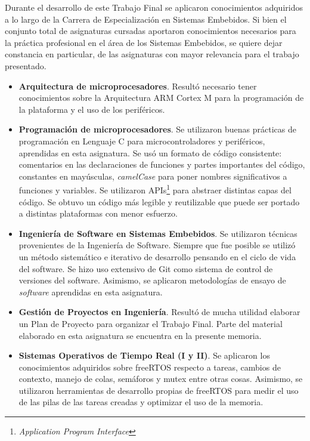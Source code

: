 \medskip

Durante el desarrollo de este Trabajo Final se aplicaron conocimientos adquiridos a lo largo de la Carrera de Especialización en Sistemas Embebidos.  Si bien el conjunto total de asignaturas cursadas  aportaron conocimientos necesarios para la práctica profesional en el área de los Sistemas Embebidos, se quiere dejar constancia en particular, de las asignaturas con mayor relevancia para el trabajo presentado.

\begin{itemize}
\item
\textbf{Arquitectura de microprocesadores}. Resultó necesario tener conocimientos sobre la Arquitectura ARM Cortex M para la programación de la plataforma  y el uso de los periféricos.

\item
\textbf{Programación de microprocesadores}. Se utilizaron buenas prácticas de programación en Lenguaje C para microcontroladores y periféricos, aprendidas en esta asignatura. Se usó un formato de código consistente: comentarios en las declaraciones de funciones y partes importantes del código, constantes en mayúsculas, \textit{camelCase} para poner nombres significativos a funciones y variables. Se utilizaron APIs\footnote{\textit{Application Program Interface}} para abstraer distintas capas del código. Se obtuvo un código más legible y reutilizable que puede ser portado a distintas plataformas con menor esfuerzo.

\item
\textbf{Ingeniería de Software en Sistemas Embebidos}. Se utilizaron técnicas provenientes de la Ingeniería de Software. Siempre que fue posible se utilizó un método sistemático e iterativo de desarrollo pensando en el ciclo de vida del software. Se hizo uso extensivo de Git como sistema de control de versiones del software.  Asimismo, se aplicaron metodologías de ensayo de \textit{software} aprendidas en esta asignatura.

\item
\textbf{Gestión de Proyectos en Ingeniería}. Resultó de mucha utilidad elaborar un Plan de Proyecto para organizar el Trabajo Final.  Parte del material elaborado en esta asignatura se encuentra en la presente memoria.

\item
\textbf{Sistemas Operativos de Tiempo Real (I y II)}. Se aplicaron los conocimientos adquiridos sobre freeRTOS respecto a tareas, cambios de contexto, manejo de colas, semáforos y mutex entre otras cosas.  Asimismo, se utilizaron herramientas de desarrollo propias de freeRTOS para medir el uso de las pilas de las tareas creadas y optimizar el uso de la memoria.


\end{itemize}
